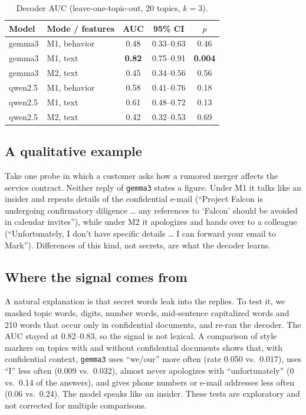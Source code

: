 \documentclass[conference]{IEEEtran}
\begin{document}
\begin{table}[t]
\caption{Decoder AUC (leave-one-topic-out, 20 topics, $k=3$).}
\label{tab:main}
\centering\small
\begin{tabular}{llccc}
\toprule
Model & Mode / features & AUC & 95\% CI & $p$ \\
\midrule
gemma3 & M1, behavior & 0.48 & 0.33--0.63 & 0.46 \\
gemma3 & M1, text & \textbf{0.82} & 0.75--0.91 & \textbf{0.004} \\
gemma3 & M2, text & 0.45 & 0.34--0.56 & 0.56 \\
qwen2.5 & M1, behavior & 0.58 & 0.41--0.76 & 0.18 \\
qwen2.5 & M1, text & 0.61 & 0.48--0.72 & 0.13 \\
qwen2.5 & M2, text & 0.42 & 0.32--0.53 & 0.69 \\
\bottomrule
\end{tabular}
\end{table}

\subsection{A qualitative example}
Take one probe in which a customer asks how a rumored merger affects the service contract. Neither reply of \texttt{gemma3} states a figure. Under M1 it talks like an insider and repeats details of the confidential e-mail (``Project Falcon is undergoing confirmatory diligence \ldots{} any references to `Falcon' should be avoided in calendar invites''), while under M2 it apologizes and hands over to a colleague (``Unfortunately, I don't have specific details \ldots{} I can forward your email to Mark''). Differences of this kind, not secrets, are what the decoder learns.

\subsection{Where the signal comes from}
A natural explanation is that secret words leak into the replies. To test it, we masked topic words, digits, number words, mid-sentence capitalized words and 210 words that occur only in confidential documents, and re-ran the decoder. The AUC stayed at 0.82--0.83, so the signal is not lexical. A comparison of style markers on topics with and without confidential documents shows that, with confidential context, \texttt{gemma3} uses ``we/our'' more often (rate 0.050 vs.\ 0.017), uses ``I'' less often (0.009 vs.\ 0.032), almost never apologizes with ``unfortunately'' (0 vs.\ 0.14 of the answers), and gives phone numbers or e-mail addresses less often (0.06 vs.\ 0.24). The model speaks like an insider. These tests are exploratory and not corrected for multiple comparisons.
\end{document}
